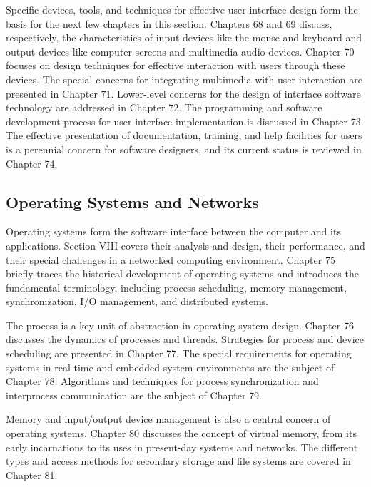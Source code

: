 Specific devices, tools, and techniques for effective
user-interface design form the basis for the next few chapters
in this section. Chapters 68 and 69 discuss, respectively, the
characteristics of input devices like the mouse and keyboard and
output devices like computer screens and multimedia audio
devices. Chapter 70 focuses on design techniques for effective
interaction with users through these devices. The special
concerns for integrating multimedia with user interaction are
presented in Chapter 71. Lower-level concerns for the design of
interface software technology are addressed in Chapter 72. The
programming and software development process for user-interface
implementation is discussed in Chapter 73.
The effective presentation of documentation, training, and help
facilities for users is a perennial concern for software
designers, and its current status is reviewed in Chapter 74.

\subsection{Operating Systems and Networks}

Operating systems form the software interface between the
computer and its applications. Section VIII covers their
analysis and design, their performance, and their special
challenges in a networked computing environment. Chapter 75
briefly traces the historical development of operating systems
and introduces the fundamental terminology, including process
scheduling, memory management, synchronization, I/O management,
and distributed systems.

The process is a key unit of abstraction in operating-system
design. Chapter 76 discusses the dynamics of processes and
threads. Strategies for process and device scheduling are
presented in Chapter 77. The special requirements  for
operating systems in real-time and embedded system environments
are the subject of Chapter 78. Algorithms and techniques for
process synchronization and interprocess communication are the
subject of Chapter 79.

Memory and input/output device management is also a central
concern of operating  systems. Chapter 80 discusses the concept
of virtual memory, from its early incarnations to its uses in
present-day systems and networks. The different types and access
methods for secondary storage and file systems are covered in
Chapter 81.

